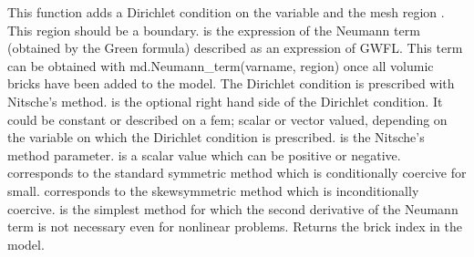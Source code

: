 \documentclass[a4paper,11pt,english]{sphinxmanual}
\begin{document}
This function adds a Dirichlet condition on the variable  and the mesh
region . This region should be a boundary. 
is the expression of the Neumann term (obtained by the Green formula)
described as an expression of GWFL. This term can be obtained with
md.Neumann\_term(varname, region) once all volumic bricks have
been added to the model. The Dirichlet
condition is prescribed with Nitsche’s method.  is the optional
right hand side of the Dirichlet condition. It could be constant or
described on a fem; scalar or vector valued, depending on the variable
on which the Dirichlet condition is prescribed.  is the
Nitsche’s method parameter.  is a scalar value which can be
positive or negative.  corresponds to the standard symmetric
method which is conditionally coercive for   small.
 corresponds to the skew\sphinxhyphen{}symmetric method which is
inconditionally coercive.  is the simplest method
for which the second derivative of the Neumann term is not necessary
even for nonlinear problems. Returns the brick index in the model.

\begin{sphinxVerbatim}[commandchars=\\\{\}]
          
      
        
       
        
\end{sphinxVerbatim}
\end{document}
